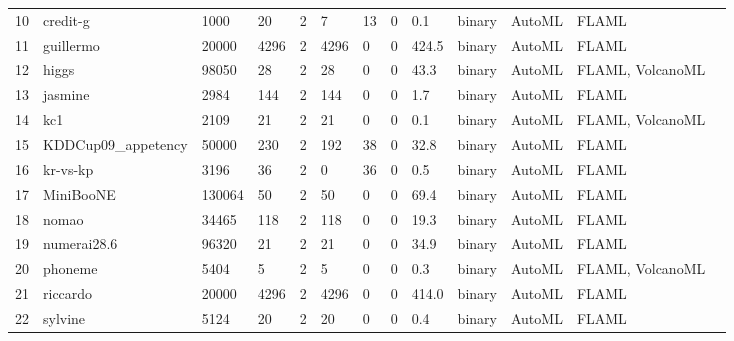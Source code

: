 \begin{table*}
\begin{tabular}{lllllllllllll}
10  & credit-g                                    & 1000    & 20     & 2     & 7     & 13     & 0         & 0.1       & binary      & AutoML & FLAML            \\
11  & guillermo                                   & 20000   & 4296   & 2     & 4296  & 0      & 0         & 424.5     & binary      & AutoML & FLAML            \\
12  & higgs                                       & 98050   & 28     & 2     & 28    & 0      & 0         & 43.3      & binary      & AutoML & FLAML, VolcanoML \\
13  & jasmine                                     & 2984    & 144    & 2     & 144   & 0      & 0         & 1.7       & binary      & AutoML & FLAML            \\
14  & kc1                                         & 2109    & 21     & 2     & 21    & 0      & 0         & 0.1       & binary      & AutoML & FLAML, VolcanoML \\
15  & KDDCup09\_appetency                         & 50000   & 230    & 2     & 192   & 38     & 0         & 32.8      & binary      & AutoML & FLAML            \\
16  & kr-vs-kp                                    & 3196    & 36     & 2     & 0     & 36     & 0         & 0.5       & binary      & AutoML & FLAML            \\
17  & MiniBooNE                                   & 130064  & 50     & 2     & 50    & 0      & 0         & 69.4      & binary      & AutoML & FLAML            \\
18  & nomao                                       & 34465   & 118    & 2     & 118   & 0      & 0         & 19.3      & binary      & AutoML & FLAML            \\
19  & numerai28.6                                 & 96320   & 21     & 2     & 21    & 0      & 0         & 34.9      & binary      & AutoML & FLAML            \\
20  & phoneme                                     & 5404    & 5      & 2     & 5     & 0      & 0         & 0.3       & binary      & AutoML & FLAML, VolcanoML \\
21  & riccardo                                    & 20000   & 4296   & 2     & 4296  & 0      & 0         & 414.0     & binary      & AutoML & FLAML            \\
22  & sylvine                                     & 5124    & 20     & 2     & 20    & 0      & 0         & 0.4       & binary      & AutoML & FLAML            \\

\end{tabular}
\end{table*}
